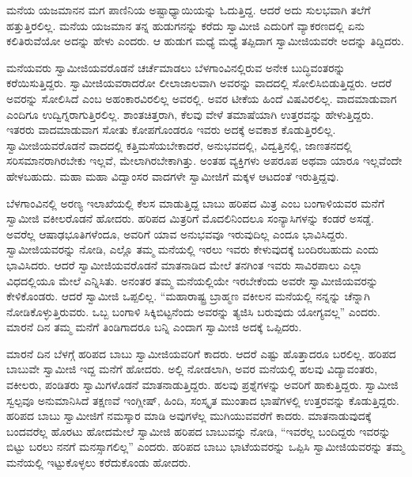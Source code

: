  ಮನೆಯ ಯಜಮಾನನ ಮಗ ಪಾಣಿನಿಯ ಅಷ್ಟಾಧ್ಯಾಯಿಯನ್ನು ಓದುತ್ತಿದ್ದ. ಆದರೆ ಅದು ಸುಲಭವಾಗಿ ತಲೆಗೆ ಹತ್ತುತ್ತಿರಲಿಲ್ಲ. ಮನೆಯ ಯಜಮಾನ ತನ್ನ ಹುಡುಗನನ್ನು ಕರೆದು ಸ್ವಾಮೀಜಿ ಎದುರಿಗೆ ವ್ಯಾಕರಣದಲ್ಲಿ ಏನು ಕಲಿತಿರುವೆಯೋ ಅದನ್ನು ಹೇಳು ಎಂದರು. ಆ ಹುಡುಗ ಮಧ್ಯೆ ಮಧ್ಯೆ ತಪ್ಪಿದಾಗ ಸ್ವಾಮೀಜಿಯವರೇ ಅದನ್ನು ತಿದ್ದಿದರು. 

 ಮನೆಯವರು ಸ್ವಾಮೀಜಿಯವರೊಡನೆ ಚರ್ಚೆಮಾಡಲು ಬೆಳಗಾಂವಿನಲ್ಲಿರುವ ಅನೇಕ ಬುದ್ಧಿವಂತರನ್ನು ಕರೆಯಿಸುತ್ತಿದ್ದರು. ಸ್ವಾಮೀಜಿಯವರಾದರೋ ಲೀಲಾಜಾಲವಾಗಿ ಅವರನ್ನು ವಾದದಲ್ಲಿ ಸೋಲಿಸಿಬಿಡುತ್ತಿದ್ದರು. ಆದರೆ ಅವರನ್ನು ಸೋಲಿಸಿದೆ ಎಂಬ ಅಹಂಕಾರವಿರಲಿಲ್ಲ ಅವರಲ್ಲಿ. ಅವರ ಟೀಕೆಯ ಹಿಂದೆ ವಿಷವಿರಲಿಲ್ಲ. ವಾದಮಾಡುವಾಗ ಎಂದಿಗೂ ಉದ್ವಿಗ್ನರಾಗುತ್ತಿರಲಿಲ್ಲ. ಶಾಂತಚಿತ್ತರಾಗಿ, ಕೆಲವು ವೇಳೆ ತಮಾಷೆಯಾಗಿ ಉತ್ತರವನ್ನು ಹೇಳುತ್ತಿದ್ದರು. ಇತರರು ವಾದಮಾಡುವಾಗ ಸೋತು ಕೋಪಗೊಂಡರೂ ಇವರು ಅದಕ್ಕೆ ಅವಕಾಶ ಕೊಡುತ್ತಿರಲಿಲ್ಲ. ಸ್ವಾಮೀಜಿಯವರೊಡನೆ ವಾದದಲ್ಲಿ ಕತ್ತಿಮಸೆಯಬೇಕಾದರೆ, ಅನುಭವದಲ್ಲಿ, ವಿದ್ವತ್ತಿನಲ್ಲಿ, ಜಾಣತನದಲ್ಲಿ ಸರಿಸಮಾನರಾಗಿರಬೇಕು ಇಲ್ಲವೆ, ಮೇಲಾಗಿರಬೇಕಾಗಿತ್ತು. ಅಂತಹ ವ್ಯಕ್ತಿಗಳು ಅಪರೂಪ ಅಥವಾ ಯಾರೂ ಇಲ್ಲವೆಂದೇ ಹೇಳಬಹುದು. ಮಹಾ ಮಹಾ ವಿದ್ವಾಂಸರ ವಾದಗಳೇ ಸ್ವಾಮೀಜಿಗೆ ಮಕ್ಕಳ ಆಟದಂತೆ ಇರುತ್ತಿದ್ದವು. 

 ಬೆಳಗಾಂವಿನಲ್ಲಿ ಅರಣ್ಯ ಇಲಾಖೆಯಲ್ಲಿ ಕೆಲಸ ಮಾಡುತ್ತಿದ್ದ ಬಾಬು ಹರಿಪದ ಮಿತ್ರ ಎಂಬ ಬಂಗಾಳಿಯವರ ಮನೆಗೆ ಸ್ವಾಮೀಜಿ ವಕೀಲರೊಡನೆ ಹೋದರು. ಹರಿಪದ ಮಿತ್ರರಿಗೆ ಮೊದಲಿನಿಂದಲೂ ಸಂನ್ಯಾಸಿಗಳನ್ನು ಕಂಡರೆ ಅಸಡ್ಡೆ. ಅವರೆಲ್ಲ ಆಷಾಢಭೂತಿಗಳೆಂದೂ, ಅವರಿಗೆ ಯಾವ ಅನುಭವವೂ ಇರುವುದಿಲ್ಲ ಎಂದೂ ಭಾವಿಸಿದ್ದರು. ಸ್ವಾಮೀಜಿಯವರನ್ನು ನೋಡಿ, ಎಲ್ಲೊ ತಮ್ಮ ಮನೆಯಲ್ಲಿ ಇರಲು ಇವರು ಕೇಳುವುದಕ್ಕೆ ಬಂದಿರಬಹುದು ಎಂದು ಭಾವಿಸಿದರು. ಆದರೆ ಸ್ವಾಮೀಜಿಯವರೊಡನೆ ಮಾತನಾಡಿದ ಮೇಲೆ ತನಗಿಂತ ಇವರು ಸಾವಿರಪಾಲು ಎಲ್ಲಾ ವಿಧದಲ್ಲಿಯೂ ಮೇಲೆ ಎನ್ನಿಸಿತು. ಅನಂತರ ತಮ್ಮ ಮನೆಯಲ್ಲಿಯೇ ಇರಬೇಕೆಂದು ಅವರೇ ಸ್ವಾಮೀಜಿಯವರನ್ನು ಕೇಳಿಕೊಂಡರು. ಆದರೆ ಸ್ವಾಮೀಜಿ ಒಪ್ಪಲಿಲ್ಲ. “ಮಹಾರಾಷ್ಟ್ರ ಬ್ರಾಹ್ಮಣ ವಕೀಲನ ಮನೆಯಲ್ಲಿ ನನ್ನನ್ನು ಚೆನ್ನಾಗಿ ನೋಡಿಕೊಳ್ಳುತ್ತಿರುವರು. ಒಬ್ಬ ಬಂಗಾಳಿ ಸಿಕ್ಕಿಬಿಟ್ಟನೆಂದು ಅವರನ್ನು ತ್ಯಜಿಸಿ ಬರುವುದು ಯೋಗ್ಯವಲ್ಲ” ಎಂದರು. ಮಾರನೆ ದಿನ ತಮ್ಮ ಮನೆಗೆ ತಿಂಡಿಗಾದರೂ ಬನ್ನಿ ಎಂದಾಗ ಸ್ವಾಮೀಜಿ ಅದಕ್ಕೆ ಒಪ್ಪಿದರು. 

 ಮಾರನೆ ದಿನ ಬೆಳಗ್ಗೆ ಹರಿಪದ ಬಾಬು ಸ್ವಾಮೀಜಿಯವರಿಗೆ ಕಾದರು. ಆದರೆ ಎಷ್ಟು ಹೊತ್ತಾದರೂ ಬರಲಿಲ್ಲ. ಹರಿಪದ ಬಾಬುವೇ ಸ್ವಾಮೀಜಿ ಇದ್ದ ಮನೆಗೆ ಹೋದರು. ಅಲ್ಲಿ ನೋಡಲಾಗಿ, ಅವರ ಮನೆಯಲ್ಲಿ ಹಲವು ವಿದ್ಯಾವಂತರು, ವಕೀಲರು, ಪಂಡಿತರು ಸ್ವಾಮಿಗಳೊಡನೆ ಮಾತನಾಡುತ್ತಿದ್ದರು. ಹಲವು ಪ್ರಶ್ನೆಗಳನ್ನು ಅವರಿಗೆ ಹಾಕುತ್ತಿದ್ದರು. ಸ್ವಾಮೀಜಿ ಸ್ವಲ್ಪವೂ ಅನುಮಾನಿಸಿದೆ ತಕ್ಷಣವೆ ಇಂಗ್ಲೀಷ್, ಹಿಂದಿ, ಸಂಸ್ಕೃತ ಮುಂತಾದ ಭಾಷೆಗಳಲ್ಲಿ ಉತ್ತರವನ್ನು ಕೊಡುತ್ತಿದ್ದರು. ಹರಿಪದ ಬಾಬು ಸ್ವಾಮೀಜಿಗೆ ನಮಸ್ಕಾರ ಮಾಡಿ ಅವುಗಳೆಲ್ಲ ಮುಗಿಯುವವರೆಗೆ ಕಾದರು. ಮಾತನಾಡುವುದಕ್ಕೆ ಬಂದವರೆಲ್ಲ ಹೊರಟು ಹೋದಮೇಲೆ ಸ್ವಾಮೀಜಿ ಹರಿಪದ ಬಾಬುವನ್ನು ನೋಡಿ, “ಇವರೆಲ್ಲ ಬಂದಿದ್ದರು ಇವರನ್ನು ಬಿಟ್ಟು ಬರಲು ನನಗೆ ಮನಸ್ಸಾಗಲಿಲ್ಲ” ಎಂದರು. ಹರಿಪದ ಬಾಬು ಭಾಟೆಯವರನ್ನು ಒಪ್ಪಿಸಿ ಸ್ವಾಮೀಜಿಯವರನ್ನು ತಮ್ಮ ಮನೆಯಲ್ಲಿ ಇಟ್ಟುಕೊಳ್ಳಲು ಕರೆದುಕೊಂಡು ಹೋದರು. 


